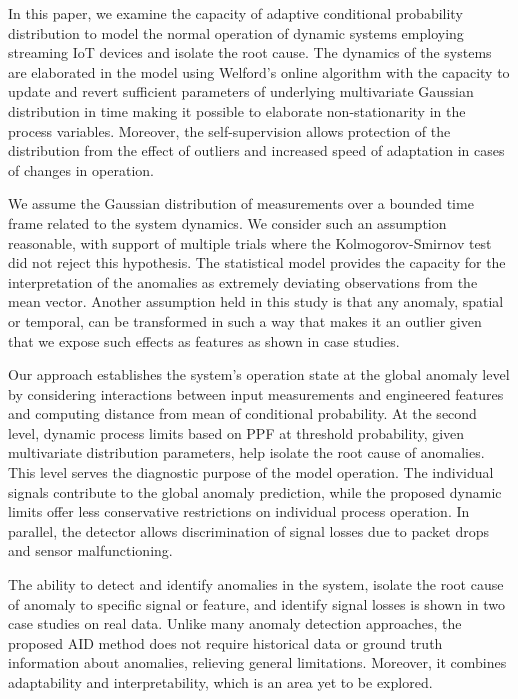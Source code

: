 In this paper, we examine the capacity of adaptive conditional probability distribution to model the normal operation of dynamic systems employing streaming IoT devices and isolate the root cause. The dynamics of the systems are elaborated in the model using Welford's online algorithm with the capacity to update and revert sufficient parameters of underlying multivariate Gaussian distribution in time making it possible to elaborate non-stationarity in the process variables. Moreover, the self-supervision allows protection of the distribution from the effect of outliers and increased speed of adaptation in cases of changes in operation.

We assume the Gaussian distribution of measurements over a bounded time frame related to the system dynamics. We consider such an assumption reasonable, with support of multiple trials where the Kolmogorov-Smirnov test did not reject this hypothesis. The statistical model provides the capacity for the interpretation of the anomalies as extremely deviating observations from the mean vector. Another assumption held in this study is that any anomaly, spatial or temporal, can be transformed in such a way that makes it an outlier given that we expose such effects as features as shown in case studies.

Our approach establishes the system's operation state at the global anomaly level by considering interactions between input measurements and engineered features and computing distance from mean of conditional probability. At the second level, dynamic process limits based on PPF at threshold probability, given multivariate distribution parameters, help isolate the root cause of anomalies. This level serves the diagnostic purpose of the model operation. The individual signals contribute to the global anomaly prediction, while the proposed dynamic limits offer less conservative restrictions on individual process operation. In parallel, the detector allows discrimination of signal losses due to packet drops and sensor malfunctioning.

The ability to detect and identify anomalies in the system, isolate the root cause of anomaly to specific signal or feature, and identify signal losses is shown in two case studies on real data. Unlike many anomaly detection approaches, the proposed AID method does not require historical data or ground truth information about anomalies, relieving general limitations. Moreover, it combines adaptability and interpretability, which is an area yet to be explored.

